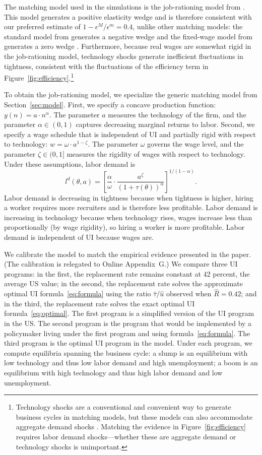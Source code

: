 \documentclass[letterpaper,12pt,leqno]{article}
\newcommand{\pre}[1]{\left( #1 \right)}
\newcommand{\brk}[1]{\left[ #1 \right]}
\def \e{{\epsilon}}
\def \o{{\omega}}
\def \t{{\theta}}
\def \z{{\zeta}}
\def \a{{\alpha}}
\begin{document}
The matching model used in the simulations is the job-rationing model from \citet{M09}. This model generates a positive elasticity wedge and is therefore consistent with our preferred estimate of $1-\e^{M}/\e^{m}=0.4$, unlike other matching models: the standard model from \citet{P00} generates a negative wedge and the fixed-wage model from \citet{H05} generates a zero wedge \citep[Section IV]{LMS10}. Furthermore, because real wages are somewhat rigid in the job-rationing model, technology shocks generate inefficient fluctuations in tightness, consistent with the fluctuations of the efficiency term in Figure~\ref{fig:efficiency}.\footnote{Technology shocks are a conventional and convenient way to generate business cycles in matching models, but these models can also accommodate aggregate demand shocks \citep{MS13}. Matching the evidence in Figure~\ref{fig:efficiency} requires labor demand shocks---whether these are aggregate demand or technology shocks is unimportant.}

To obtain the job-rationing model, we specialize the generic matching model from Section~\ref{sec:model}. First, we specify a concave production function: $y(n)=a\cdot n^{\a}$. The parameter $a$ measures the technology of the firm, and the parameter $\a \in(0,1)$ captures decreasing marginal returns to labor. Second, we specify a wage schedule that is independent of UI and partially rigid with respect to technology: $w=\o\cdot a^{1-\z}$. The parameter $\o$ governs the wage level, and the parameter $\z\in(0,1]$ measures the rigidity of wages with respect to technology. Under these assumptions, labor demand is
\begin{equation}
l^{d}(\t,a)=\brk{\frac{\a}{\o}\cdot \frac{a^{\z}}{\pre{1+\tau(\t)}^{\a}}}^{1/(1-\a)}.
\label{eq:jr}\end{equation}
Labor demand is decreasing in tightness because when tightness is higher, hiring a worker requires more recruiters and is therefore less profitable. Labor demand is increasing in technology because when technology rises, wages increase less than proportionally (by wage rigidity), so hiring a worker is more profitable. Labor demand is independent of UI because wages are. 

We calibrate the model to match the empirical evidence presented in the paper. (The calibration is relegated to Online Appendix~G.) We compare three UI programs: in the first, the replacement rate remains constant at 42 percent, the average US value; in the second, the replacement rate solves the approximate optimal UI formula~\eqref{eq:formula} using the ratio $\hat{\tau}/\hat{u}$ observed when $\hat{R}=0.42$; and in the third, the replacement rate solves the exact optimal UI formula~\eqref{eq:optimal}. The first program is a simplified version of the UI program in the US. The second program is the program that would be implemented by a policymaker living under the first program and using formula~\eqref{eq:formula}. The third program is the optimal UI program in the model. Under each program, we compute equilibria spanning the business cycle: a slump is an equilibrium with low technology and thus low labor demand and high unemployment; a boom is an equilibrium with high technology and thus high labor demand and low unemployment.
\end{document}
